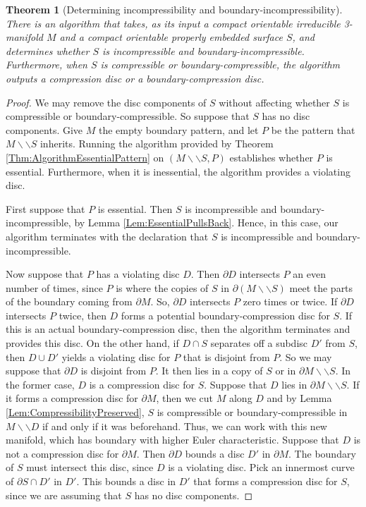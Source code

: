 \documentclass[oneside]{amsart}
\numberwithin{equation}{section}
\theoremstyle{plain}
\newtheorem{theorem}[equation]{Theorem}
\theoremstyle{definition}
\newcommand{\cut}{\backslash\backslash}
\begin{document}
\begin{theorem}[{\sc Determining incompressibility and boundary-incompressibility}] 
\label{Thm:DeterminingBoundaryIncompressible}
There is an algorithm that takes, as its input a compact orientable irreducible 3-manifold $M$ and a compact orientable properly embedded surface $S$, 
and determines whether $S$ is incompressible and boundary-incompressible. Furthermore, when $S$ is compressible or boundary-compressible, the algorithm outputs a compression disc or a boundary-compression disc.
\end{theorem}

\begin{proof}
We may remove the disc components of $S$ without affecting whether $S$ is compressible or boundary-compressible. So suppose that $S$ has no disc components.
Give $M$ the empty boundary pattern, and let $P$ be the pattern that $M \cut S$ inherits. Running the algorithm
provided by Theorem \ref{Thm:AlgorithmEssentialPattern} on $(M \cut S, P)$ establishes whether $P$ is essential. Furthermore, when it is inessential, the algorithm provides a violating disc.

First suppose that $P$ is essential. Then $S$ is incompressible and boundary-incompressible, by Lemma \ref{Lem:EssentialPullsBack}. Hence, in this case, our algorithm terminates with the declaration that $S$ is incompressible and boundary-incompressible.

Now suppose that $P$ has a violating disc $D$. Then $\partial D$ intersects $P$ an even number of times, since $P$ is where the copies of $S$ in $\partial (M \cut S)$ meet the parts of the boundary coming from $\partial M$. So, $\partial D$ intersects $P$ zero times or twice. If $\partial D$ intersects $P$ twice, then $D$ forms a potential boundary-compression disc for $S$. If this is an actual boundary-compression disc, then the algorithm terminates and provides this disc. On the other hand, if $D \cap S$ separates off a subdisc $D'$ from $S$, then $D \cup D'$ yields a violating disc for $P$ that is disjoint from $P$. So we may suppose that $\partial D$ is disjoint from $P$. It then lies in a copy of $S$ or in $\partial M \cut S$. In the former case, $D$ is a compression disc for $S$. Suppose that $D$ lies in $\partial M \cut S$. If it forms a compression disc for $\partial M$, then we cut $M$ along $D$ and by Lemma \ref{Lem:CompressibilityPreserved}, $S$ is compressible or boundary-compressible in $M \cut D$ if and only if it was beforehand. Thus, we can work with this new manifold, which has boundary with higher Euler characteristic. Suppose that $D$ is not a compression disc for $\partial M$. Then $\partial D$ bounds a disc $D'$ in $\partial M$. The boundary of $S$ must intersect this disc, since $D$ is a violating disc. Pick an innermost curve of $\partial S \cap D'$ in $D'$. This bounds a disc in $D'$ that forms a compression disc for $S$, since we are assuming that $S$ has no disc components.
\end{proof}
\end{document}
